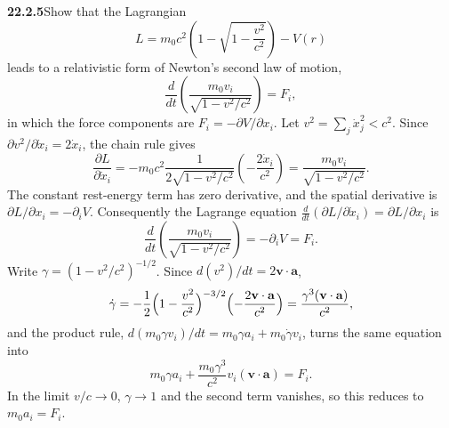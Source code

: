 \par\bigskip
\noindent\textbf{22.2.5}\quad Show that the Lagrangian
\[
L=m_{0}c^{2}\left(1-\sqrt{1-\frac{v^{2}}{c^{2}}}\right)-V(r)
\]
leads to a relativistic form of Newton's second law of motion,
\[
\frac{d}{dt}\left(\frac{m_{0}v_{i}}{\sqrt{1-v^{2}/c^{2}}}\right)
=F_{i},
\]
in which the force components are $F_{i}=-\partial V/\partial
x_{i}$.
\solution
Let $v^2=\sum_j\dot x_j^2<c^2$. Since
$\partial v^2/\partial\dot x_i=2\dot x_i$, the chain rule gives
\[
\frac{\partial L}{\partial\dot x_i}
=-m_0c^2\frac{1}{2\sqrt{1-v^2/c^2}}
\left(-\frac{2\dot x_i}{c^2}\right)
=\frac{m_0v_i}{\sqrt{1-v^2/c^2}}.
\]
The constant rest-energy term has zero derivative, and the spatial
derivative is $\partial L/\partial x_i=-\partial_iV$.
Consequently the Lagrange equation
$\frac d{dt}(\partial L/\partial\dot x_i)=\partial L/\partial x_i$ is
\[
\boxed{\frac d{dt}
\left(\frac{m_0v_i}{\sqrt{1-v^2/c^2}}\right)
=-\partial_iV=F_i}.
\]
Write $\gamma=(1-v^2/c^2)^{-1/2}$. Since $d(v^2)/dt=2\mathbf v\cdot\mathbf a$,
\[
\dot\gamma=-\frac12\Bigl(1-\frac{v^2}{c^2}\Bigr)^{-3/2}
\Bigl(-\frac{2\mathbf v\cdot\mathbf a}{c^2}\Bigr)
=\frac{\gamma^3(\mathbf v\cdot\mathbf a)}{c^2},
\]
and the product rule, $d(m_0\gamma v_i)/dt=m_0\gamma a_i+m_0\dot\gamma v_i$,
turns the same equation into
\[
m_0\gamma a_i+
\frac{m_0\gamma^3}{c^2}v_i(\mathbf v\cdot\mathbf a)=F_i.
\]
In the limit $v/c\to0$, $\gamma\to1$ and the second term vanishes, so
this reduces to $m_0a_i=F_i$.


